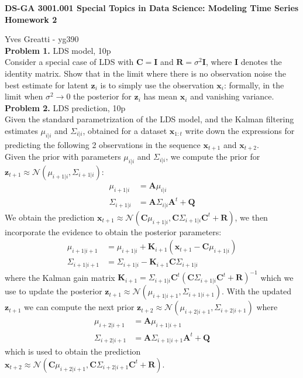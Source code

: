 \documentclass[12pt]{article}
\newcommand{\matr}[1]{\bm{#1}}     %
\newcommand{\vect}[1]{\mathbf{#1}}
\begin{document}
\thispagestyle{empty}
\begin{center}

\textbf{DS-GA 3001.001 Special Topics in Data Science: Modeling Time Series\\
Homework 2}
\end{center}

\noindent Yves Greatti - yg390\\

\noindent \textbf{Problem 1.} LDS model, 10p \\ %
Consider a special case of LDS with $\vect{C} = \vect{I}$ and  $\vect{R} = \sigma^2 \vect{I}$, where $\vect{I}$ denotes the identity matrix. 
Show that in the limit where there is no observation noise the best estimate for latent $\vect{z}_i$ is to simply use the observation $\vect{x}_i$: 
formally, in the limit when $\sigma^2 \rightarrow 0$ the posterior for $\vect{z}_i$ has mean $\vect{x}_i$ and vanishing variance.\\

\noindent \textbf{Problem 2. } LDS prediction, 10p \\%
Given the standard parametrization of the LDS model, and the Kalman filtering estimates $\mu_{i|i}$ and $\Sigma_{i|i}$, obtained for a dataset $\vect{x}_{1:t}$ write down the expressions 
for predicting the following 2 observations in the sequence $\vect{x}_{t+1}$ and  $\vect{x}_{t+2}$.\\
Given the prior with parameters  $\mu_{i|i}$ and $\Sigma_{i|i}$, we compute the prior for $\vect{z}_{t + 1} \approx \mathcal{N} (\mu_{i+1|i}, \Sigma_{i+1|i})$:
\begin{align*}
	\mu_{i+1|i}	&= 	\matr{A} \mu_{i|i} \\
	\Sigma_{i+1|i}	&=	 \matr{A}  \Sigma_{i|i}  \matr{A}^t + \matr{Q}
\end{align*}
We obtain the prediction $\vect{x}_{t+1} \approx \mathcal{N} (\matr{C} \mu_{i+1|i}, \matr{C} \Sigma_{i+1|i} \matr{C}^t + \matr{R} )$, we then incorporate the evidence to obtain the posterior parameters:
\begin{align*}
	\mu_{i+1|i+1}		&= 	\mu_{i+1|i} + \matr{K}_{i+1} (\vect{x}_{t+1} - \matr{C} \mu_{i+1|i}) \\
	\Sigma_{i+1|i+1}	&=	\Sigma_{i+1|i} - \matr{K}_{i+1} 	 \matr{C}  \Sigma_{i+1|i}
\end{align*}
where the Kalman gain matrix $ \matr{K}_{i+1} = \Sigma_{i+1|i}	 \matr{C} ^t ( \matr{C} \Sigma_{i+1|i}  \matr{C} ^t + \matr{R})^{-1}$
which we use to update the posterior $\vect{z}_{t+1} \approx \mathcal{N} (\mu_{i+1|i+1},\Sigma_{i+1|i+1})$.
With the updated  $\vect{z}_{t+1}$ we can compute the next prior $\vect{z}_{t + 2} \approx \mathcal{N} (\mu_{i+2|i+1}, \Sigma_{i+2|i+1})$ where 
\begin{align*}
	\mu_{i+2|i+1}		&= 	\matr{A} \mu_{i+1|i+1} \\
	\Sigma_{i+2|i+1}	&=	 \matr{A}  \Sigma_{i+1|i+1}  \matr{A}^t + \matr{Q}
\end{align*}
which is used to obtain the prediction  $\vect{x}_{t+2} \approx \mathcal{N} (\matr{C} \mu_{i+2|i+1}, \matr{C} \Sigma_{i+2|i+1} \matr{C}^t + \matr{R} )$.
 
\end{document}
